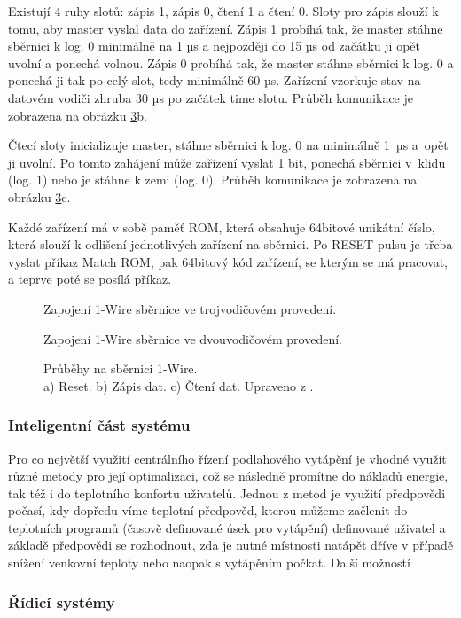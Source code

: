 Existují 4 ruhy slotů: zápis 1, zápis 0, čtení 1 a čtení 0. Sloty pro zápis slouží k tomu, aby master vyslal data do zařízení. Zápis 1 probíhá tak, že master stáhne sběrnici k log. 0 minimálně na 1 µs a nejpozději do 15 µs od začátku ji opět uvolní a ponechá volnou. Zápis 0 probíhá tak, že master stáhne sběrnici k log. 0 a ponechá ji tak po celý slot, tedy minimálně 60 µs. Zařízení vzorkuje stav na datovém vodiči zhruba 30 µs po začátek time slotu. Průběh komunikace je zobrazena na obrázku \ref{fig:1-wire-reset-vysilani-prijem-dat}b.

Čtecí sloty inicializuje master, stáhne sběrnici k log. 0 na minimálně 1~µs a~opět ji uvolní. Po tomto zahájení může zařízení vyslat 1 bit, ponechá sběrnici v~klidu (log. 1) nebo je stáhne k zemi (log. 0). Průběh komunikace je zobrazena na obrázku \ref{fig:1-wire-reset-vysilani-prijem-dat}c.

Každé zařízení má v sobě paměť ROM, která obsahuje 64bitové unikátní číslo, která slouží k odlišení jednotlivých zařízení na sběrnici. Po RESET pulsu je třeba vyslat příkaz Match ROM, pak 64bitový kód zařízení, se kterým se má pracovat, a teprve poté se posílá příkaz.


\begin{figure}[H]
    \centering
    \def\svgwidth{\columnwidth}
    
    \caption{Zapojení 1-Wire sběrnice ve trojvodičovém provedení.}
    \label{fig:1-wire-sbernice-tri-vodice}
\end{figure}

\begin{figure}[H]
    \centering
    \def\svgwidth{\columnwidth}
    
    \caption{Zapojení 1-Wire sběrnice ve dvouvodičovém provedení.}
    \label{fig:1-wire-sbernice-dva-vodice}
\end{figure}



\begin{figure}[H]
    \centering
    \def\svgwidth{\columnwidth}
    
    \caption{Průběhy na sběrnici 1-Wire. \\ 
    a) Reset. b) Zápis dat. c) Čtení dat. Upraveno z \cite{1-wire-sbernice-prubehy}.}
    \label{fig:1-wire-reset-vysilani-prijem-dat}
\end{figure}

\subsubsection{Inteligentní část systému}
Pro co největší využití centrálního řízení podlahového vytápění je vhodné využít různé metody pro její optimalizaci, což se následně promítne do nákladů energie, tak též i do teplotního konfortu uživatelů. Jednou z metod je využití předpovědi počasí, kdy dopředu víme teplotní předpověď, kterou můžeme začlenit do teplotních programů (časově definované úsek pro vytápění) definované uživatel a základě  předpovědi se rozhodnout, zda je nutné místnosti natápět dříve v případě snížení venkovní teploty nebo naopak s vytápěním počkat. Další možností 

\subsubsection{Řídicí systémy}